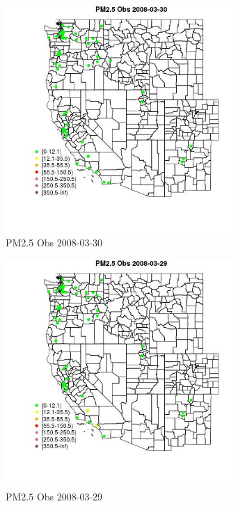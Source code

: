 \begin{figure} 
\centering  
\includegraphics[width=0.77\textwidth]{Code_Outputs/Report_ML_input_PM25_Step4_part_e_de_duplicated_aves_MapObsPM25_Obs2008-03-30.jpg} 
\caption{\label{fig:Report_ML_input_PM25_Step4_part_e_de_duplicated_avesMapObsPM25_Obs2008-03-30}PM2.5 Obs 2008-03-30} 
\end{figure} 
 

\begin{figure} 
\centering  
\includegraphics[width=0.77\textwidth]{Code_Outputs/Report_ML_input_PM25_Step4_part_e_de_duplicated_aves_MapObsPM25_Obs2008-03-29.jpg} 
\caption{\label{fig:Report_ML_input_PM25_Step4_part_e_de_duplicated_avesMapObsPM25_Obs2008-03-29}PM2.5 Obs 2008-03-29} 
\end{figure} 
 

